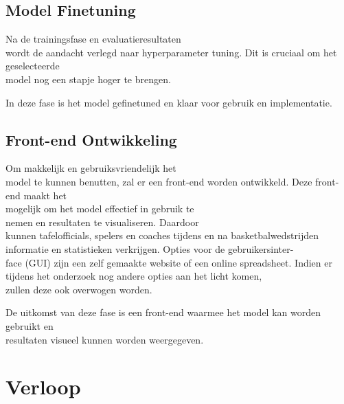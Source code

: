 \subsection{Model Finetuning}

Na de trainingsfase en evaluatieresultaten \\wordt de aandacht verlegd naar hyperparameter tuning. Dit is cruciaal om het geselecteerde \\model nog een stapje hoger te brengen.

In deze fase is het model gefinetuned en klaar voor gebruik en implementatie.



\subsection{Front-end Ontwikkeling}
Om makkelijk en gebruiksvriendelijk het \\model te kunnen benutten, zal er een front-end worden ontwikkeld. 
Deze front-end maakt het \\mogelijk om het model effectief in gebruik te \\nemen en resultaten te visualiseren. Daardoor \\kunnen tafelofficials, spelers en coaches tijdens en na basketbalwedstrijden informatie en statistieken verkrijgen. 
Opties voor de gebruikersinter-\\face (GUI) zijn een zelf gemaakte website of een online spreadsheet. Indien er tijdens het onderzoek nog andere opties aan het licht komen, \\zullen deze ook overwogen worden.

De uitkomst van deze fase is een front-end waarmee het model kan worden gebruikt en \\resultaten visueel kunnen worden weergegeven.


\section{Verloop}%
\label{sec:verloop}

